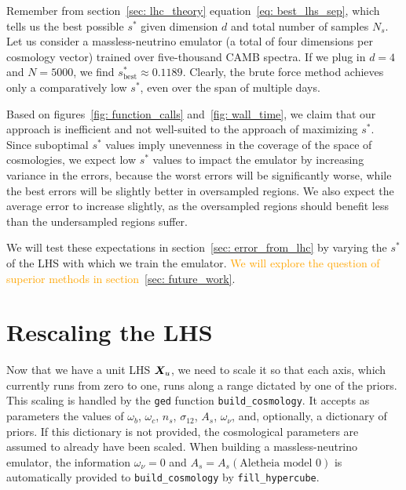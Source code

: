 Remember from section~\ref{sec: lhc_theory} equation~\ref{eq: best_lhs_sep},
which tells us the best possible $s^*$
given dimension $d$ and total number of samples $N_s$. Let us consider a 
massless-neutrino emulator (a total of four dimensions per cosmology vector)
trained over five-thousand CAMB spectra. If we plug in $d = 4$ and $N=5000$,
we find $s^*_\text{best} \approx 0.1189$. Clearly, the brute force method
achieves only a comparatively low $s^*$, even over the span of multiple days.

Based on figures~\ref{fig: function_calls} and~\ref{fig: wall_time}, we
claim that our approach is inefficient and not well-suited to the approach of 
maximizing $s^*$. Since suboptimal $s^*$ values imply unevenness in the
coverage of the space of cosmologies, we expect low $s^*$ values to impact
the emulator by increasing variance in the errors, because the worst errors
will be significantly worse, while the best errors will be slightly better in
oversampled regions. We also expect the average error to increase slightly,
as the oversampled regions should benefit less than the undersampled regions
suffer.


We will test these expectations in section~\ref{sec: error_from_lhc} by
varying the $s^*$ of the LHS with which we train the emulator.
\textcolor{orange}{We will explore the question of superior methods in
section~\ref{sec: future_work}}.


\section{Rescaling the LHS}
\label{sec: lhc_rescale}


Now that we have a unit LHS $\bm{X}_u$, we need to scale it 
so that each axis, which currently runs from zero to one, runs along a range 
dictated by one of the priors. This scaling is handled by the \texttt{ged}
function \verb|build_cosmology|. It accepts as parameters the values of
$\omega_b$, $\omega_c$, $n_s$, $\sigma_{12}$, $A_s$, $\omega_\nu$, and, 
optionally, a dictionary of priors. If this
dictionary is not provided, the cosmological parameters are assumed to
already have been scaled. When building a massless-neutrino emulator,
the information $\omega_\nu = 0$ and $A_s = A_s(\text{Aletheia model 0})$ is
automatically provided to \verb|build_cosmology| by
\verb|fill_hypercube|. 

